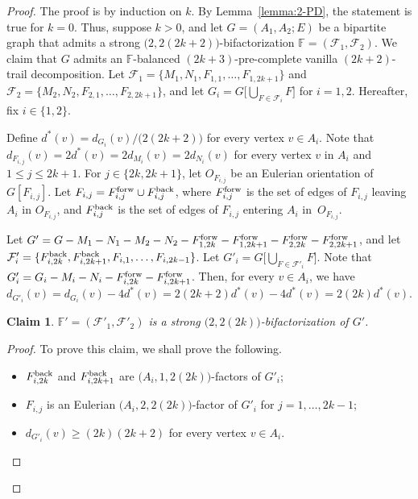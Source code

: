 \documentclass[12pt,reqno,a4paper]{amsart}
\newtheorem{claim}[theorem]{Claim}
\def\back{\mathop{\text{\rm back}}\nolimits}
\def\forw{\mathop{\text{\rm forw}}\nolimits}
\begin{document}
\begin{proof}
The proof is by induction on \(k\).
By Lemma~\ref{lemma:2-PD}, the statement is true for \(k = 0\).
Thus, suppose \(k>0\),
and let \(G = (A_1,A_2;E)\) be a bipartite graph that admits a strong 
\(\big(2,2(2k+2)\big)\)-bifactorization 
\(\mathbb{F} = (\mathcal{F}_1,\mathcal{F}_2)\).
We claim that \(G\) admits an \(\mathbb{F}\)-balanced 
\((2k+3)\)-pre-complete
vanilla $(2k+2)$-trail decomposition. Let \(\mathcal{F}_1 = 
\{M_1,N_1,F_{1,1},\ldots,F_{1,2k+1}\}\) 
and \(\mathcal{F}_2 = \{M_2,N_2,F_{2,1},\ldots,F_{2,2k+1}\}\), and let \(G_i = 
G\big[\bigcup_{F\in\mathcal{F}_i} F\big]\) for \(i = 1,2\). 
Hereafter, fix \(i\in\{1,2\}\).

Define \(d^*(v) = d_{G_i}(v)/\big(2(2k+2)\big)\) for every vertex $v\in A_i$.
Note that \(d_{F_{i,j}}(v) = 2d^*(v) = 2d_{M_i}(v) = 2d_{N_i}(v)\) for every 
vertex \(v\) in \(A_i\)
and \(1\leq j\leq 2k+1\).
For \(j \in \{2k,2k+1\}\), let \(O_{F_{i,j}}\) be an Eulerian 
orientation of \(G[F_{i,j}]\).
Let \(F_{i,j} = F_{i,j}^{\forw} \cup F_{i,j}^{\back}\), where 
\(F_{i,j}^{\forw}\) is the set of edges
of \(F_{i,j}\) leaving $A_i$ in \(O_{F_{i,j}}\), and 
\(F_{i,j}^{\back}\) 
is the set of edges
of \(F_{i,j}\) entering $A_i$ in~\(O_{F_{i,j}}\).


Let \(G' = G - M_1 - N_1 - M_2 - N_2 - F_{1,2k}^{\forw} - F_{1,2k+1}^{\forw} 
	- F_{2,2k}^{\forw} - F_{2,2k+1}^{\forw}\),
and let \(\mathcal{F}'_i = 
\{F_{i,2k}^{\back},F_{i,2k+1}^{\back},F_{i,1},\ldots, 
F_{i,2k-1}\}\).
Let \(G'_i = G\big[\bigcup_{F\in\mathcal{F}'_i} F\big]\).
Note that \(G'_i = G_i - M_i - N_i - F_{i,2k}^{\forw} - F_{i,2k+1}^{\forw}\).
Then, for every $v\in A_i$, we have
\begin{equation}\label{even-d}
d_{G'_i}(v) = d_{G_i}(v) - 4d^*(v)
	    = 2(2k+2)d^*(v) - 4d^*(v)
	    = 2(2k)d^*(v).
\end{equation}

\begin{claim}
\(\mathbb{F}' = (\mathcal{F}'_1,\mathcal{F}'_2)\) 
is a strong \(\big(2,2(2k)\big)\)-bifactorization of \(G'\).
\end{claim}

\begin{proof}
To prove this claim, we shall prove the following.
\begin{itemize}
	\item[(i)] \(F_{i,2k}^{\back}\) and \(F_{i,2k+1}^{\back}\) 
			are \(\big(A_i,1,2(2k)\big)\)-factors of \(G'_i\);
	\item[(ii)] \(F_{i,j}\) is an Eulerian \(\big(A_i,2,2(2k)\big)\)-factor 
			of \(G'_i\) for \(j = 1,\ldots,2k-1\);
	\item[(iii)] \(d_{G'_i}(v) \geq (2k)(2k+2)\) for every vertex \(v\in 
A_i\).\\
\end{itemize}


\end{proof}
\end{proof}
\end{document}
